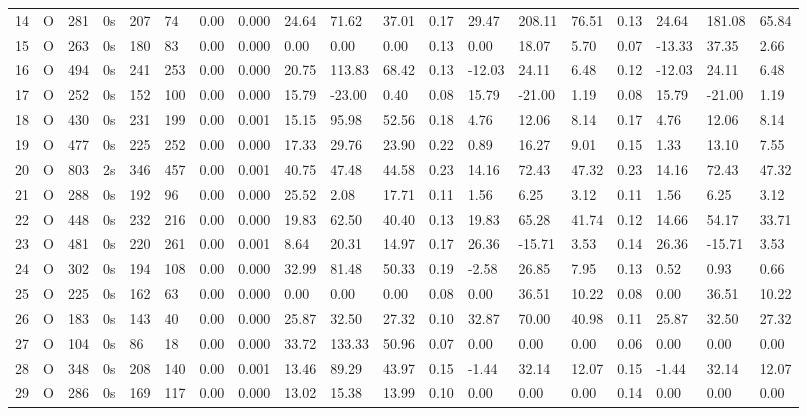 \begin{tabular}{rllllllrlllllllllll}
14 & O & 281 & 0s & 207 & 74 & 0.00 & 0.000 & 24.64 & 71.62 & 37.01 & 0.17 & 29.47 & 208.11 & 76.51 & 0.13 & 24.64 & 181.08 & 65.84 \\
15 & O & 263 & 0s & 180 & 83 & 0.00 & 0.000 & 0.00 & 0.00 & 0.00 & 0.13 & 0.00 & 18.07 & 5.70 & 0.07 & -13.33 & 37.35 & 2.66 \\
16 & O & 494 & 0s & 241 & 253 & 0.00 & 0.000 & 20.75 & 113.83 & 68.42 & 0.13 & -12.03 & 24.11 & 6.48 & 0.12 & -12.03 & 24.11 & 6.48 \\
17 & O & 252 & 0s & 152 & 100 & 0.00 & 0.000 & 15.79 & -23.00 & 0.40 & 0.08 & 15.79 & -21.00 & 1.19 & 0.08 & 15.79 & -21.00 & 1.19 \\
18 & O & 430 & 0s & 231 & 199 & 0.00 & 0.001 & 15.15 & 95.98 & 52.56 & 0.18 & 4.76 & 12.06 & 8.14 & 0.17 & 4.76 & 12.06 & 8.14 \\
19 & O & 477 & 0s & 225 & 252 & 0.00 & 0.000 & 17.33 & 29.76 & 23.90 & 0.22 & 0.89 & 16.27 & 9.01 & 0.15 & 1.33 & 13.10 & 7.55 \\
20 & O & 803 & 2s & 346 & 457 & 0.00 & 0.001 & 40.75 & 47.48 & 44.58 & 0.23 & 14.16 & 72.43 & 47.32 & 0.23 & 14.16 & 72.43 & 47.32 \\
21 & O & 288 & 0s & 192 & 96 & 0.00 & 0.000 & 25.52 & 2.08 & 17.71 & 0.11 & 1.56 & 6.25 & 3.12 & 0.11 & 1.56 & 6.25 & 3.12 \\
22 & O & 448 & 0s & 232 & 216 & 0.00 & 0.000 & 19.83 & 62.50 & 40.40 & 0.13 & 19.83 & 65.28 & 41.74 & 0.12 & 14.66 & 54.17 & 33.71 \\
23 & O & 481 & 0s & 220 & 261 & 0.00 & 0.001 & 8.64 & 20.31 & 14.97 & 0.17 & 26.36 & -15.71 & 3.53 & 0.14 & 26.36 & -15.71 & 3.53 \\
24 & O & 302 & 0s & 194 & 108 & 0.00 & 0.000 & 32.99 & 81.48 & 50.33 & 0.19 & -2.58 & 26.85 & 7.95 & 0.13 & 0.52 & 0.93 & 0.66 \\
25 & O & 225 & 0s & 162 & 63 & 0.00 & 0.000 & 0.00 & 0.00 & 0.00 & 0.08 & 0.00 & 36.51 & 10.22 & 0.08 & 0.00 & 36.51 & 10.22 \\
26 & O & 183 & 0s & 143 & 40 & 0.00 & 0.000 & 25.87 & 32.50 & 27.32 & 0.10 & 32.87 & 70.00 & 40.98 & 0.11 & 25.87 & 32.50 & 27.32 \\
27 & O & 104 & 0s & 86 & 18 & 0.00 & 0.000 & 33.72 & 133.33 & 50.96 & 0.07 & 0.00 & 0.00 & 0.00 & 0.06 & 0.00 & 0.00 & 0.00 \\
28 & O & 348 & 0s & 208 & 140 & 0.00 & 0.001 & 13.46 & 89.29 & 43.97 & 0.15 & -1.44 & 32.14 & 12.07 & 0.15 & -1.44 & 32.14 & 12.07 \\
29 & O & 286 & 0s & 169 & 117 & 0.00 & 0.000 & 13.02 & 15.38 & 13.99 & 0.10 & 0.00 & 0.00 & 0.00 & 0.14 & 0.00 & 0.00 & 0.00 \\

\end{tabular}
